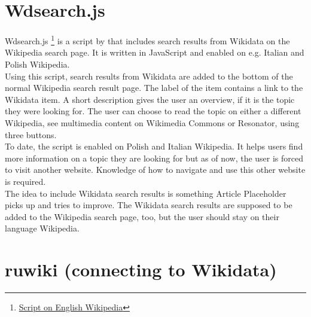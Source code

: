 \section{Wdsearch.js}
Wdsearch.js \footnote{\href{https://en.wikipedia.org/w/index.php?title=MediaWiki:Wdsearch.js&action=raw&ctype=text/javascript}{Script on English Wikipedia}} is a script by  that includes search results from Wikidata on the Wikipedia search page. It is written in JavaScript and enabled on e.g. Italian and Polish Wikipedia. \\
Using this script, search results from Wikidata are added to the bottom of the normal Wikipedia search result page. The label of the item  contains a link to the Wikidata item. A short description gives the user an overview, if it is the topic they were looking for. The user can choose to read the topic on either a different Wikipedia, see multimedia content on Wikimedia Commons or Resonator, using three buttons. \\
To date, the script is enabled on Polish and Italian Wikipedia. It helps users find more information on a topic they are looking for but as of now, the user is forced to visit another website. Knowledge of how to navigate and use this other website is required. \\
The idea to include Wikidata search results is something Article Placeholder picks up and tries to improve. The Wikidata search results are supposed to be added to the Wikipedia search page, too, but the user should stay on their language Wikipedia.

\section{ruwiki (connecting to Wikidata)}